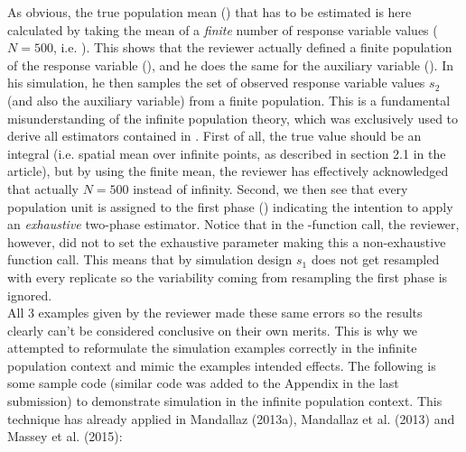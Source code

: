 \documentclass{article}
\begin{document}
As obvious, the true population mean () that has to be estimated is here calculated by taking the mean of a \textit{finite} number of response variable values ($N=500$, i.e. ). This shows that the reviewer actually defined a finite population of the response variable (), and he does the same for the auxiliary variable (). In his simulation, he then samples the set of observed response variable values $s_2$ (and also the auxiliary variable) from a finite population. This is a fundamental misunderstanding of the infinite population theory, which was exclusively used to derive all estimators contained in . First of all, the true value should be an integral (i.e. spatial mean over infinite points, as described in section 2.1 in the article), but by using the finite mean, the reviewer has effectively acknowledged that actually $N=500$ instead of infinity. Second, we then see that every population unit is assigned to the first phase () indicating the intention to apply an \textit{exhaustive} two-phase estimator. Notice that in the -function call, the reviewer, however, did not to set the exhaustive parameter making this a non-exhaustive function call. This means that by simulation design $s_1$ does not get resampled with every replicate so the variability coming from resampling the first phase is ignored.\\

All 3 examples given by the reviewer made these same errors so the results clearly can't be considered conclusive on their own merits.  This is why we attempted to reformulate the simulation examples correctly in the infinite population context and mimic the examples intended effects. The following is some sample code (similar code was added to the Appendix in the last submission) to demonstrate simulation in the infinite population context.  This technique has already applied in Mandallaz (2013a), Mandallaz et al. (2013) and Massey et al. (2015):
\end{document}

